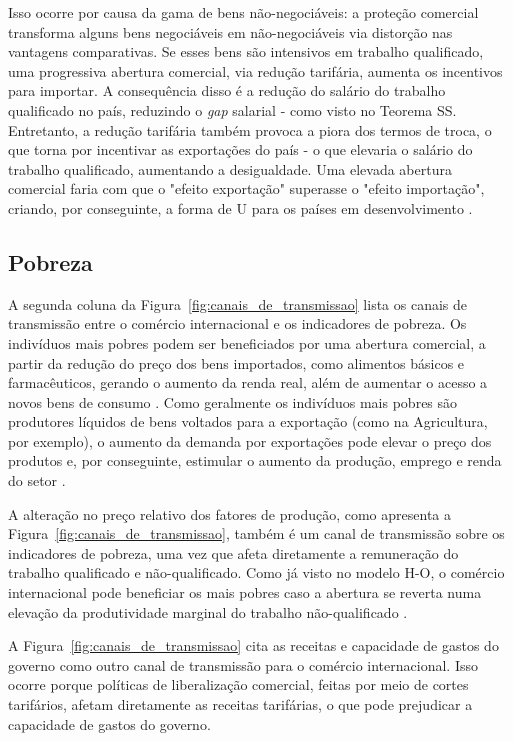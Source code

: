 Isso ocorre por causa da gama de bens não-negociáveis: a proteção comercial transforma alguns bens negociáveis em não-negociáveis via distorção nas vantagens comparativas. Se esses bens são intensivos em trabalho qualificado, uma progressiva abertura comercial, via redução tarifária, aumenta os incentivos para importar. A consequência disso é a redução do salário do trabalho qualificado no país, reduzindo o \textit{gap} salarial - como visto no Teorema SS. Entretanto, a redução tarifária também provoca a piora dos termos de troca, o que torna por incentivar as exportações do país - o que elevaria o salário do trabalho qualificado, aumentando a desigualdade. Uma elevada abertura comercial faria com que o "efeito exportação" superasse o "efeito importação", criando, por conseguinte, a forma de U para os países em desenvolvimento \cite{goldbergpavcnik04}.


\subsection{Pobreza} \label{subsec:pobreza}

A segunda coluna da Figura~\ref{fig:canais_de_transmissao} lista os canais de transmissão entre o comércio internacional e os indicadores de pobreza. Os indivíduos mais pobres podem ser beneficiados por uma abertura comercial, a partir da redução do preço dos bens importados, como alimentos básicos e farmacêuticos, gerando o aumento da renda real, além de aumentar o acesso a novos bens de consumo \cite{bannisterthugge01}. Como geralmente os indivíduos mais pobres são produtores líquidos de bens voltados para a exportação (como na Agricultura, por exemplo), o aumento da demanda por exportações pode elevar o preço dos produtos e, por conseguinte, estimular o aumento da produção, emprego e renda do setor \cite{bannisterthugge01}.

A alteração no preço relativo dos fatores de produção, como apresenta a Figura~\ref{fig:canais_de_transmissao}, também é um canal de transmissão sobre os indicadores de pobreza, uma vez que afeta diretamente a remuneração do trabalho qualificado e não-qualificado. Como já visto no modelo H-O, o comércio internacional pode beneficiar os mais pobres caso a abertura se reverta numa elevação da produtividade marginal do trabalho não-qualificado \cite{bannisterthugge01}.

A Figura~\ref{fig:canais_de_transmissao} cita as receitas e capacidade de gastos do governo como outro canal de transmissão para o comércio internacional. Isso ocorre porque políticas de liberalização comercial, feitas por meio de cortes tarifários, afetam diretamente as receitas tarifárias, o que pode prejudicar a capacidade de gastos do governo.

